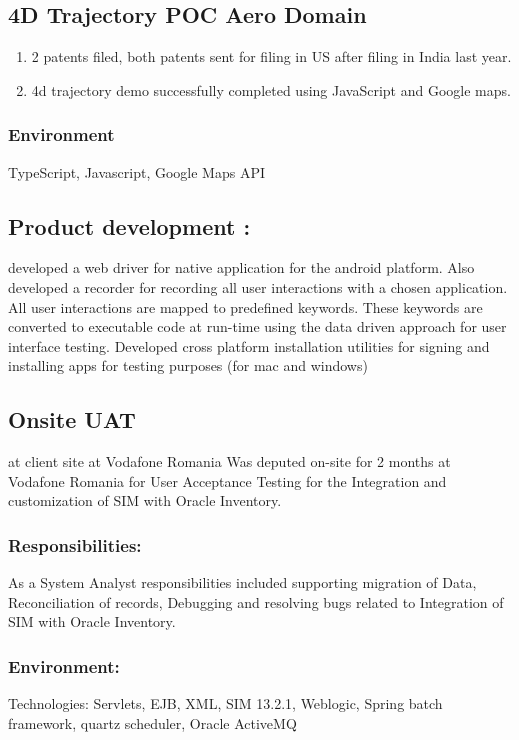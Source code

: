 \documentclass[letterpaper]{article}
\begin{document}
\subsection{4D Trajectory POC Aero Domain}
\label{sec:orgheadline12}
\begin{enumerate}
\item 2 patents filed, both patents sent for filing in US after filing in India last year.
\item 4d trajectory demo successfully completed using JavaScript and Google maps.
\end{enumerate}
\subsubsection{Environment}
\label{sec:orgheadline11}
TypeScript, Javascript, Google Maps API


\subsection{Product development :}
\label{sec:orgheadline13}
developed a web driver for native application for the android platform. Also developed a recorder for recording all user interactions with a chosen application. All user interactions are mapped to predefined keywords. These keywords are converted to executable code at run-time using the data driven approach for user interface testing. 
Developed cross platform installation utilities for signing and installing apps for testing purposes (for mac and windows)

\subsection{Onsite UAT}
\label{sec:orgheadline16}
at client site at Vodafone Romania
Was deputed on-site for 2 months at Vodafone Romania for User Acceptance Testing for the Integration and customization of SIM with Oracle Inventory.

\subsubsection{Responsibilities:}
\label{sec:orgheadline14}
As a System Analyst responsibilities included supporting migration of Data, Reconciliation of records, Debugging and resolving bugs related to Integration of SIM with Oracle Inventory. 

\subsubsection{Environment:}
\label{sec:orgheadline15}
Technologies:  Servlets, EJB, XML, SIM 13.2.1, Weblogic, Spring batch framework, quartz scheduler, Oracle ActiveMQ
\end{document}
